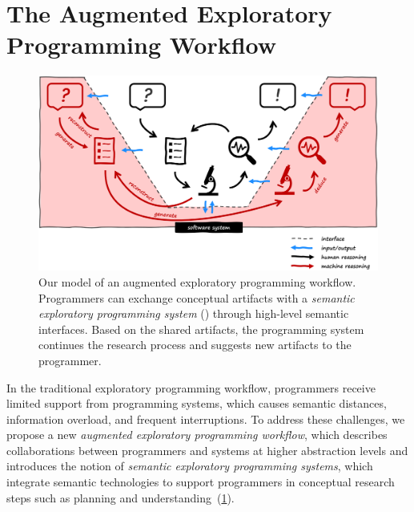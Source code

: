 
\section{The Augmented Exploratory Programming Workflow}
\label{sec:approach/workflow}

\begin{figure}
	\centering
	\includegraphics[width=\textwidth]{01_workflow/workflow.png}
	\caption[Our model of an \emph{augmented exploratory programming workflow}.]{
		Our model of an augmented exploratory programming workflow.
		Programmers can exchange conceptual artifacts with a \emph{semantic exploratory programming system} (\bold{\textcolor[HTML]{c00000}{red}}) through high-level semantic interfaces.
		Based on the shared artifacts, the programming system continues the research process and suggests new artifacts to the programmer.
	}
	\label{fig:approach/workflow/workflow}
\end{figure}

In the traditional exploratory programming workflow, programmers receive limited support from programming systems, which causes semantic distances, information overload, and frequent interruptions.
To address these challenges, we propose a new \emph{augmented exploratory programming workflow}, which describes collaborations between programmers and systems at higher abstraction levels and introduces the notion of \emph{semantic exploratory programming systems}, which integrate semantic technologies to support programmers in conceptual research steps such as planning and understanding~(\cref{fig:approach/workflow/workflow}).

